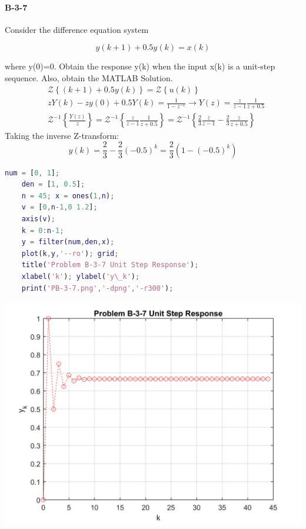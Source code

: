 \paragraph{B-3-7}

Consider the difference equation system

$$ y(k+1)+0.5y(k)=x(k)$$

where y(0)=0. Obtain the response y(k) when the input x(k) is a unit-step sequence. Also, obtain the MATLAB Solution.
\begin{align*}
& \mathcal{Z} \left\{(k+1)+0.5y(k)\right\}= \mathcal{Z} \left\{u(k) \right\} \\
& zY(k)-zy(0)+0.5Y(k) = \frac{1}{1-z^{-1}} \rightarrow Y(z) = \frac{z}{z-1}\frac{1}{z+0.5} \\
& \mathcal{Z}^{-1} \left\{\frac{Y(z)}{z}\right\} = 
\mathcal{Z}^{-1} \left\{ \frac{z}{z-1} \frac{1}{z+0.5}\right\} = \mathcal{Z}^{-1} \left\{ \frac{2}{3}\frac{z}{z-1}-\frac{2}{3}\frac{z}{z+0.5} \right\}
\end{align*}
Taking the inverse Z-transform:
\[
y(k)=\frac{2}{3}-\frac{2}{3}(-0.5)^k = \frac{2}{3} \left(1-(-0.5)^k\right)
\]

	\begin{lstlisting}[language=Matlab,caption=Matlab Code for B-2-17]
	num = [0, 1]; 
	den = [1, 0.5]; 
	n = 45; x = ones(1,n);
	v = [0,n-1,0 1.2];
	axis(v);
	k = 0:n-1;
	y = filter(num,den,x); 
	plot(k,y,'--ro'); grid;
	title('Problem B-3-7 Unit Step Response');
	xlabel('k'); ylabel('y\_k');
	print('PB-3-7.png','-dpng','-r300');
	\end{lstlisting}
\includegraphics[width=1\linewidth]{PB-3-7.png}


